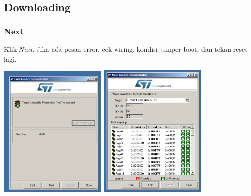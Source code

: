 \documentclass[table,dvipsnames]{beamer}
\begin{document}
	\subsection{Downloading}
	\begin{frame}
		\frametitle{Next}
		\begin{block}{}
			Klik \textit{Next}. Jika ada pesan error, cek wiring, kondisi jumper boot, dan tekan reset lagi.
		\end{block}
		\begin{center}
			\includegraphics[width=150pt]{images/demons1}
			\includegraphics[width=150pt]{images/demons2}
		\end{center}
	\end{frame}
\end{document}
